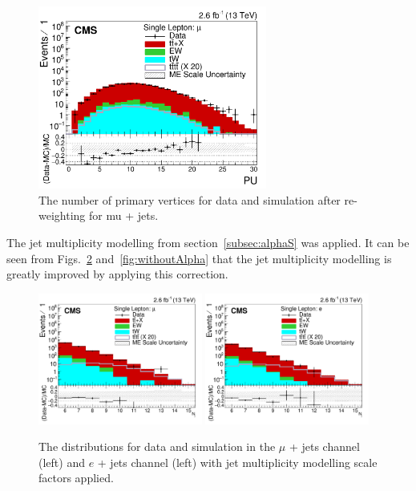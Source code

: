 \begin{figure}[h!]
\begin{center}
\includegraphics[width=0.67\textwidth]{images/Run2/PU_StackLogY.pdf}
\end{center}
\caption{The number of primary vertices for data and simulation after re-weighting for mu + jets.}
\label{fig:PUReWeight13}
\end{figure} 

The jet multiplicity modelling from section~\ref{subsec:alphaS} was applied. It can be seen from Figs.~\ref{fig:withAlpha} and~\ref{fig:withoutAlpha} that the jet multiplicity modelling is greatly improved by applying this correction.

\begin{figure}[ht!]
    \includegraphics[width=0.48\textwidth]{images/Run2/nJets_StackLogY.pdf}
    \includegraphics[width=0.48\textwidth]{images/Run2/nJets_StackLogY_e.pdf}
    \caption{The \njets distributions for data and simulation in the $\mu$ + jets channel (left) and $e$ + jets channel (left) with jet multiplicity modelling scale factors applied.}
    \label{fig:withAlpha}
\end{figure}

